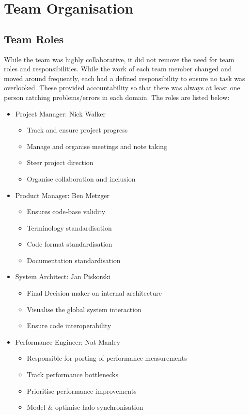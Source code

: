 \section{Team Organisation}
\subsection{Team Roles}
While the team was highly collaborative, it did not remove the need for team roles and responsibilities. While the work of each team member changed and moved around frequently, each had a defined responsibility to ensure no task was overlooked. These provided accountability so that there was always at least one person catching problems/errors in each domain. The roles are listed below:

\begin{itemize}
  \item Project Manager: Nick Walker
  \begin{itemize}
      \item Track and ensure project progress 
      \item Manage and organise meetings and note taking
      \item Steer project direction
      \item Organise collaboration and inclusion
  \end{itemize}
  \item Product Manager: Ben Metzger
  \begin{itemize}
      \item Ensures code-base validity 
      \item Terminology standardisation
      \item Code format standardisation
      \item Documentation standardisation
  \end{itemize}
  \item System Architect: Jan Piskorski
  \begin{itemize}
      \item Final Decision maker on internal architecture
      \item Visualise the global system interaction
      \item Ensure code interoperability
  \end{itemize}
  \item Performance Engineer: Nat Manley
  \begin{itemize}
        \item Responsible for porting of performance measurements
      \item Track performance bottlenecks
      \item Prioritise performance improvements
      \item Model \& optimise halo synchronisation
  \end{itemize}
\end{itemize}

